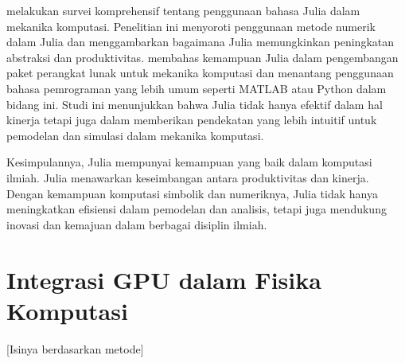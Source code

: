 \cite{xiaoJuliaLanguageComputational2022b} melakukan survei komprehensif tentang
penggunaan bahasa Julia dalam mekanika komputasi. Penelitian ini menyoroti penggunaan
metode numerik dalam Julia dan menggambarkan bagaimana Julia memungkinkan peningkatan
abstraksi dan produktivitas. \cite{xiaoJuliaLanguageComputational2022b} membahas
kemampuan Julia dalam pengembangan paket perangkat lunak untuk mekanika
komputasi dan menantang penggunaan bahasa pemrograman yang lebih umum seperti
MATLAB atau Python dalam bidang ini. Studi ini menunjukkan bahwa Julia tidak hanya
efektif dalam hal kinerja tetapi juga dalam memberikan pendekatan yang lebih intuitif
untuk pemodelan dan simulasi dalam mekanika komputasi.

Kesimpulannya, Julia mempunyai kemampuan yang baik dalam komputasi ilmiah. Julia
menawarkan keseimbangan antara produktivitas dan kinerja. Dengan kemampuan
komputasi simbolik dan numeriknya, Julia tidak hanya meningkatkan efisiensi dalam
pemodelan dan analisis, tetapi juga mendukung inovasi dan kemajuan dalam
berbagai disiplin ilmiah.

\section{Integrasi GPU dalam Fisika Komputasi}

[Isinya berdasarkan metode]





